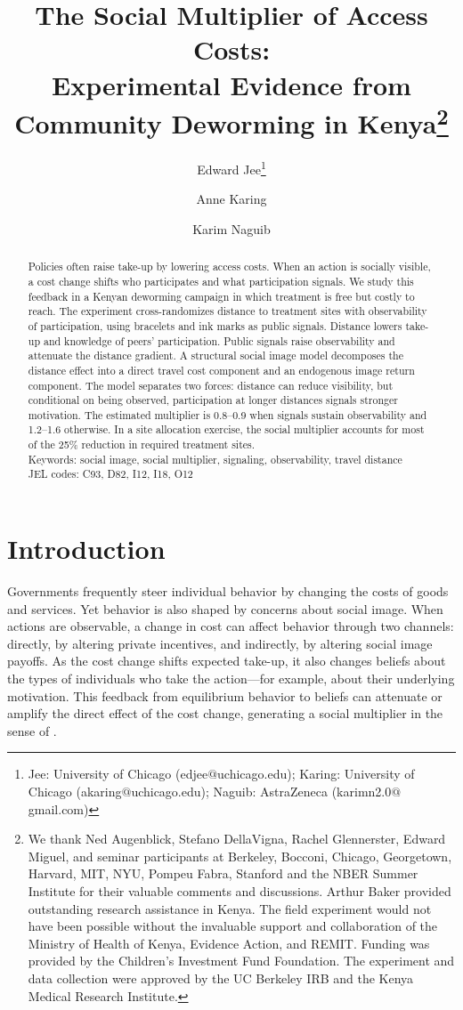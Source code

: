 \documentclass[12pt,a4paper]{article}
\author{Edward Jee\thanks{Jee: University of Chicago (edjee$@$uchicago.edu); Karing: University of Chicago (akaring$@$uchicago.edu); Naguib: AstraZeneca (karimn2.0$@$gmail.com)}
  \and
  Anne Karing 
    \and
  Karim Naguib}
\title{\Large{The Social Multiplier of Access Costs: \\ Experimental Evidence from Community Deworming in Kenya}\thanks{We thank Ned Augenblick, Stefano DellaVigna, Rachel Glennerster, Edward Miguel, and seminar participants at Berkeley, Bocconi, Chicago, Georgetown, Harvard, MIT, NYU, Pompeu Fabra, Stanford and the NBER Summer Institute for their valuable comments and discussions. Arthur Baker provided outstanding research assistance in Kenya. The field experiment would not have been possible without the invaluable support and collaboration of the Ministry of Health of Kenya, Evidence Action, and REMIT. Funding was provided by the Children's Investment Fund Foundation. The experiment and data collection were approved by the UC Berkeley IRB and the Kenya Medical Research Institute.} }
\begin{document}
  \maketitle


  \begin{abstract}
  
  Policies often raise take-up by lowering access costs. When an action is socially visible, a cost change shifts who participates and what participation signals. We study this feedback in a Kenyan deworming campaign in which treatment is free but costly to reach. The experiment cross-randomizes distance to treatment sites with observability of participation, using bracelets and ink marks as public signals. Distance lowers take-up and knowledge of peers' participation. Public signals raise observability and attenuate the distance gradient. A structural social image model decomposes the distance effect into a direct travel cost component and an endogenous image return component. The model separates two forces: distance can reduce visibility, but conditional on being observed, participation at longer distances signals stronger motivation. The estimated multiplier is 0.8–0.9 when signals sustain observability and 1.2–1.6 otherwise. In a site allocation exercise, the social multiplier accounts for most of the 25\% reduction in required treatment sites. \\

\noindent Keywords: social image, social multiplier, signaling, observability, travel distance\\
\noindent JEL codes: C93, D82, I12, I18, O12


\end{abstract}






\clearpage
\onehalfspacing




\section{Introduction}
\label{intro}


Governments frequently steer individual behavior by changing the costs of goods and services. Yet behavior is also shaped by concerns about social image. When actions are observable, a change in cost can affect behavior through two channels: directly, by altering private incentives, and indirectly, by altering social image payoffs. As the cost change shifts expected take-up, it also changes beliefs about the types of individuals who take the action—for example, about their underlying motivation. This feedback from equilibrium behavior to beliefs can attenuate or amplify the direct effect of the cost change, generating a social multiplier in the sense of \citet{Benabou_laws_2011}. 
\end{document}
